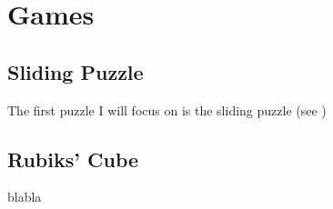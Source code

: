 
\chapter{Games} %

\label{Chapter2} %


\section{Sliding Puzzle}

The first puzzle I will focus on is the sliding puzzle (see \cite{SlidingPuzzle})

\section{Rubiks' Cube}

blabla

